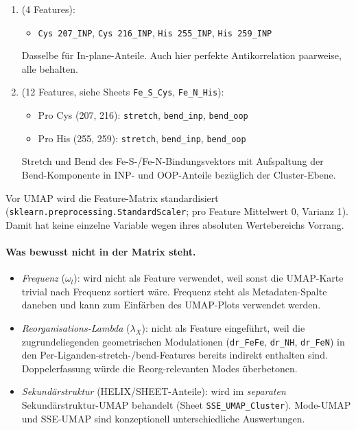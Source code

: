 \documentclass[11pt,a4paper,twoside]{article}
\theoremstyle{remark}
\begin{document}
\begin{enumerate}
  \item[\textbf{Liganden INP-Anteile}] (4 Features):
        \begin{itemize}\setlength{\itemsep}{0pt}
          \item \texttt{Cys 207\_INP}, \texttt{Cys 216\_INP},
                \texttt{His 255\_INP}, \texttt{His 259\_INP}
        \end{itemize}
        Dasselbe f\"ur In-plane-Anteile. Auch hier perfekte
        Antikorrelation paarweise, alle behalten.

  \item[\textbf{Pro-Liganden-Atom-Bewegungen}] (12 Features, siehe
        Sheets \texttt{Fe\_S\_Cys}, \texttt{Fe\_N\_His}):
        \begin{itemize}\setlength{\itemsep}{0pt}
          \item Pro Cys (207, 216): \texttt{stretch},
                \texttt{bend\_inp}, \texttt{bend\_oop}
          \item Pro His (255, 259): \texttt{stretch},
                \texttt{bend\_inp}, \texttt{bend\_oop}
        \end{itemize}
        Stretch und Bend des Fe-S-/Fe-N-Bindungsvektors mit
        Aufspaltung der Bend-Komponente in INP- und OOP-Anteile
        bez\"uglich der Cluster-Ebene.
\end{enumerate}

Vor UMAP wird die Feature-Matrix standardisiert
(\texttt{sklearn.preprocessing.StandardScaler}; pro Feature Mittelwert
0, Varianz 1). Damit hat keine einzelne Variable wegen ihres
absoluten Wertebereichs Vorrang.

\paragraph{Was bewusst nicht in der Matrix steht.}

\begin{itemize}
  \item \emph{Frequenz} ($\omega_l$): wird nicht als Feature
        verwendet, weil sonst die UMAP-Karte trivial nach Frequenz
        sortiert w\"are. Frequenz steht als Metadaten-Spalte daneben
        und kann zum Einf\"arben des UMAP-Plots verwendet werden.

  \item \emph{Reorganisations-Lambda} ($\lambda_X$): nicht als Feature
        eingef\"uhrt, weil die zugrundeliegenden geometrischen
        Modulationen (\texttt{dr\_FeFe}, \texttt{dr\_NH},
        \texttt{dr\_FeN}) in den Per-Liganden-stretch-/bend-Features
        bereits indirekt enthalten sind. Doppelerfassung w\"urde die
        Reorg-relevanten Modes \"uberbetonen.

  \item \emph{Sekund\"arstruktur} (HELIX/SHEET-Anteile): wird im
        \emph{separaten} Sekund\"arstruktur-UMAP behandelt
        (Sheet \texttt{SSE\_UMAP\_Cluster}). Mode-UMAP und
        SSE-UMAP sind konzeptionell unterschiedliche Auswertungen.
\end{itemize}
\end{document}
